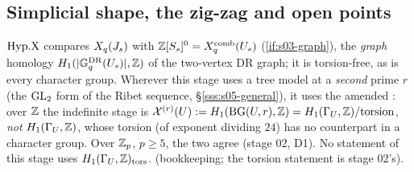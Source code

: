 \subsection{Simplicial shape, the zig-zag and open points}\label{ss:s05-simplicial}

\begin{remark}\label{rem:s05-D1}
$\mathrm{Hyp.X}$ compares $X_q(J_s)$ with $\mathbb{Z}[S_s]^0=X^{\mathrm{comb}}_q(U_s)$ (\ref{if:s03-graph}), the \emph{graph} homology $H_1(|\mathbb{G}^{\mathrm{DR}}_q(U_s)|,\mathbb{Z})$ of the
two-vertex DR graph; it is torsion-free, as is every character group. Wherever this stage uses a tree model at a \emph{second} prime $r$
(the $\mathrm{GL}_2$ form of the Ribet sequence, \S\ref{sss:s05-general}), it uses the amended : over $\mathbb{Z}$ the indefinite stage is
$\mathcal{X}^{(r)}(U):=H_1(\mathrm{BG}(U,r),\mathbb{Z})=H_1(\Gamma_U,\mathbb{Z})/\text{torsion}$, \emph{not} $H_1(\Gamma_U,\mathbb{Z})$, whose torsion (of exponent dividing $24$) has no
counterpart in a character group. Over $\mathbb{Z}_p$, $p\ge5$, the two agree (stage 02, D1). No statement of this stage uses
$H_1(\Gamma_U,\mathbb{Z})_{\rm tors}$. \stproved{} (bookkeeping; the torsion statement is stage 02's).
\end{remark}

